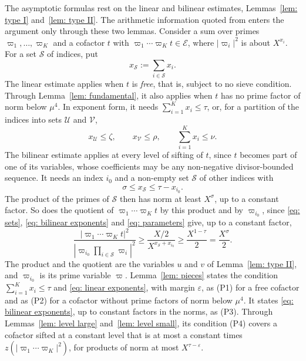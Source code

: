 \documentclass{article}
\numberwithin{equation}{section}
\newcommand{\Le}{\leqslant}
\newcommand{\Ge}{\geqslant}
\begin{document}
The asymptotic formulas rest on the linear and bilinear estimates, Lemmas~\ref{lem: type I} and~\ref{lem: type II}. The arithmetic information quoted from \citet{harman2001gaussian} enters the argument only through these two lemmas. Consider a sum over primes $\varpi_1, \dots, \varpi_K$ and a cofactor $t$ with $\varpi_1 \cdots \varpi_K t \in \mathcal{E}$, where $|\varpi_i|^2$ is about $X^{x_i}$. For a set $\mathcal{S}$ of indices, put
\begin{equation}
\label{eq: index sums}
x_{\mathcal{S}} := \sum_{i \in \mathcal{S}} x_i.
\end{equation} The linear estimate applies when $t$ is \emph{free}, that is, subject to no sieve condition. Through Lemma~\ref{lem: fundamental}, it also applies when $t$ has no prime factor of norm below $\mu^4$. In exponent form, it needs $\sum_{i=1}^{K} x_i \Le \tau$, or, for a partition of the indices into sets $\mathcal{U}$ and $\mathcal{V}$,
\begin{equation}
\label{eq: linear exponents}
x_{\mathcal{U}} \Le \zeta, \qquad x_{\mathcal{V}} \Le \rho, \qquad \sum_{i=1}^{K} x_i \Le \nu.
\end{equation}
The bilinear estimate applies at every level of sifting of $t$, since $t$ becomes part of one of its variables, whose coefficients may be any non-negative divisor-bounded sequence. It needs an index $i_0$ and a non-empty set $\mathcal{S}$ of other indices with
\begin{equation}
\label{eq: bilinear exponents}
\sigma \Le x_{\mathcal{S}} \Le \tau - x_{i_0}.
\end{equation}
The product of the primes of $\mathcal{S}$ then has norm at least $X^{\sigma}$, up to a constant factor. So does the quotient of $\varpi_1 \cdots \varpi_K t$ by this product and by $\varpi_{i_0}$, since \eqref{eq: sets}, \eqref{eq: bilinear exponents} and \eqref{eq: parameters} give, up to a constant factor,
\begin{equation*}
\frac{|\varpi_1 \cdots \varpi_K t|^2}{|\varpi_{i_0} \prod_{i \in \mathcal{S}} \varpi_i|^2} \Ge \frac{X/2}{X^{x_{\mathcal{S}} + x_{i_0}}} \Ge \frac{X^{1 - \tau}}{2} = \frac{X^{\sigma}}{2}.
\end{equation*} The product and the quotient are the variables $u$ and $v$ of Lemma~\ref{lem: type II}, and $\varpi_{i_0}$ is its prime variable $\varpi$. Lemma~\ref{lem: pieces} states the condition $\sum_{i=1}^{K} x_i \Le \tau$ and \eqref{eq: linear exponents}, with margin $\varepsilon$, as (P1) for a free cofactor and as (P2) for a cofactor without prime factors of norm below $\mu^4$. It states \eqref{eq: bilinear exponents}, up to constant factors in the norms, as (P3). Through Lemmas~\ref{lem: level large} and~\ref{lem: level small}, its condition (P4) covers a cofactor sifted at a constant level that is at most a constant times $z(|\varpi_1 \cdots \varpi_K|^2)$, for products of norm at most $X^{\tau - \varepsilon}$.
\end{document}
